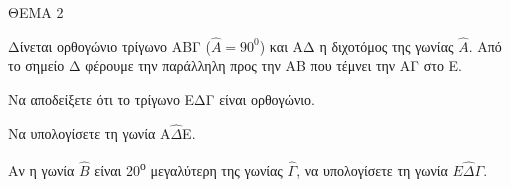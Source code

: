 
ΘΕΜΑ 2

Δίνεται ορθογώνιο τρίγωνο ΑΒΓ ($\widehat{Α} = 90^{0}$) και ΑΔ η διχοτόμος της γωνίας $\widehat{Α}$. Από το σημείο Δ φέρουμε την παράλληλη προς την ΑΒ που τέμνει την ΑΓ στο Ε.

\begin{alist}
\item Να αποδείξετε ότι το τρίγωνο ΕΔΓ είναι ορθογώνιο. 

\item Να υπολογίσετε τη γωνία Α$\widehat{\Delta}$Ε. 

\item Αν η γωνία $\widehat{Β}$ είναι 20\textsuperscript{ο} μεγαλύτερη της γωνίας $\widehat{\Gamma}$, να υπολογίσετε τη γωνία $Ε\widehat{\Delta}\Gamma$.

\end{alist}
